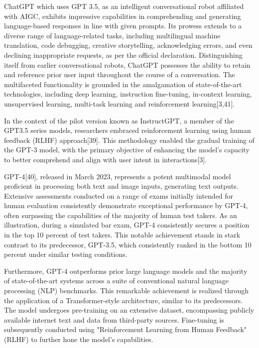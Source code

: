 \documentclass[fleqn,10pt]{thescipub} %
\begin{document}
ChatGPT which uses GPT 3.5, as an intelligent conversational robot affiliated with AIGC, exhibits impressive capabilities in comprehending and generating language-based responses in line with given prompts. Its prowess extends to a diverse range of language-related tasks, including multilingual machine translation, code debugging, creative storytelling, acknowledging errors, and even declining inappropriate requests, as per the official declaration. Distinguishing itself from earlier conversational robots, ChatGPT possesses the ability to retain and reference prior user input throughout the course of a conversation. The multifaceted functionality is grounded in the amalgamation of state-of-the-art technologies, including deep learning, instruction fine-tuning, in-context learning, unsupervised learning, multi-task learning and reinforcement learning[3,41].

In the context of the pilot version known as InstructGPT, a member of the GPT3.5 series models, researchers embraced reinforcement learning using human feedback (RLHF) approach[39]. This methodology enabled the gradual training of the GPT-3 model, with the primary objective of enhancing the model's capacity to better comprehend and align with user intent in interactions[3].

GPT-4[40], released in March 2023, represents a potent multimodal model proficient in processing both text and image inputs, generating text outputs. Extensive assessments conducted on a range of exams initially intended for human evaluation consistently demonstrate exceptional performance by GPT-4, often surpassing the capabilities of the majority of human test takers. As an illustration, during a simulated bar exam, GPT-4 consistently secures a position in the top 10 percent of test takers. This notable achievement stands in stark contrast to its predecessor, GPT-3.5, which consistently ranked in the bottom 10 percent under similar testing conditions.

Furthermore, GPT-4 outperforms prior large language models and the majority of state-of-the-art systems across a suite of conventional natural language processing (NLP) benchmarks. This remarkable achievement is realized through the application of a Transformer-style architecture, similar to its predecessors. The model undergoes pre-training on an extensive dataset, encompassing publicly available internet text and data from third-party sources. Fine-tuning is subsequently conducted using "Reinforcement Learning from Human Feedback" (RLHF) to further hone the model's capabilities.
\end{document}
